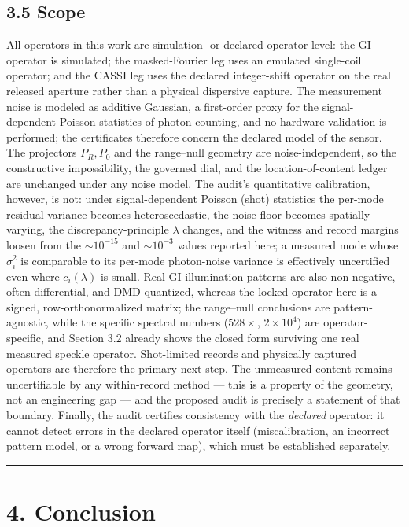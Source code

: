 \documentclass[11pt]{article}
\begin{document}
\subsection*{3.5 Scope}

All operators in this work are simulation- or declared-operator-level: the GI operator is simulated; the masked-Fourier leg uses an emulated single-coil operator; and the CASSI leg uses the declared integer-shift operator on the real released aperture rather than a physical dispersive capture. The measurement noise is modeled as additive Gaussian, a first-order proxy for the signal-dependent Poisson statistics of photon counting, and no hardware validation is performed; the certificates therefore concern the declared model of the sensor. The projectors $P_R, P_0$ and the range--null geometry are noise-independent, so the constructive impossibility, the governed dial, and the location-of-content ledger are unchanged under any noise model. The audit's quantitative calibration, however, is not: under signal-dependent Poisson (shot) statistics the per-mode residual variance becomes heteroscedastic, the noise floor becomes spatially varying, the discrepancy-principle $\lambda$ changes, and the witness and record margins loosen from the ${\sim}10^{-15}$ and ${\sim}10^{-3}$ values reported here; a measured mode whose $\sigma_i^2$ is comparable to its per-mode photon-noise variance is effectively uncertified even where $c_i(\lambda)$ is small. Real GI illumination patterns are also non-negative, often differential, and DMD-quantized, whereas the locked operator here is a signed, row-orthonormalized matrix; the range--null conclusions are pattern-agnostic, while the specific spectral numbers ($528\times$, $2\times10^4$) are operator-specific, and Section 3.2 already shows the closed form surviving one real measured speckle operator. Shot-limited records and physically captured operators are therefore the primary next step. The unmeasured content remains uncertifiable by any within-record method --- this is a property of the geometry, not an engineering gap --- and the proposed audit is precisely a statement of that boundary. Finally, the audit certifies consistency with the \textit{declared} operator: it cannot detect errors in the declared operator itself (miscalibration, an incorrect pattern model, or a wrong forward map), which must be established separately.

\medskip\hrule\medskip

\section*{4. Conclusion}
\end{document}
